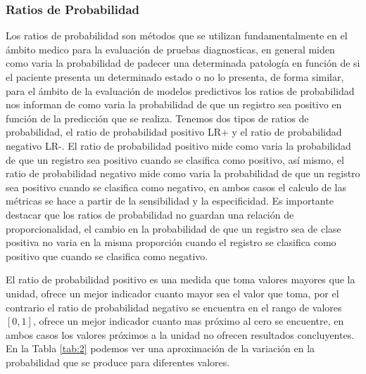 
\subsubsection{Ratios de Probabilidad}

Los ratios de probabilidad son métodos que se utilizan fundamentalmente en el ámbito medico para la evaluación de pruebas diagnosticas, en general miden como varia la probabilidad de padecer una determinada patología en función de si el paciente presenta un determinado estado o no lo presenta, de forma similar, para el ámbito de la evaluación de modelos predictivos los ratios de probabilidad nos informan de como varia la probabilidad de que un registro sea positivo en función de la predicción que se realiza.
\bigbreak
Tenemos dos tipos de ratios de probabilidad, el ratio de probabilidad positivo LR+ y el ratio de probabilidad negativo LR-. El ratio de probabilidad positivo mide como varia la probabilidad de que un registro sea positivo cuando se clasifica como positivo, así mismo, el ratio de probabilidad negativo mide como varia la probabilidad de que un registro sea positivo cuando se clasifica como negativo, en ambos casos el calculo de las métricas se hace a partir de la sensibilidad y la especificidad. Es importante destacar que los ratios de probabilidad no guardan una relación de proporcionalidad, el cambio en la probabilidad de que un registro sea de clase positiva no varia en la misma proporción cuando el registro se clasifica como positivo que cuando se clasifica como negativo.

\bigbreak
El ratio de probabilidad positivo es una medida que toma valores mayores que la unidad,  ofrece un mejor indicador cuanto mayor sea el valor que toma, por el contrario el ratio de probabilidad negativo se encuentra en el rango de valores $[0, 1]$, ofrece un mejor indicador cuanto mas próximo al cero se encuentre, en ambos casos los valores próximos a la unidad no ofrecen resultados concluyentes. En la Tabla \ref{tab:2} podemos ver una aproximación de la variación en la probabilidad que se produce para diferentes valores.
\bigbreak

